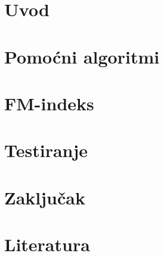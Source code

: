 \documentclass[pdftex,12pt,a4paper]{report}
\begin{document}


\tableofcontents

\chapter{Uvod}


\chapter{Pomoćni algoritmi}


\chapter{FM-indeks}


\chapter{Testiranje}


\chapter{Zaključak}


\chapter{Literatura}

%

% 
\end{document}

